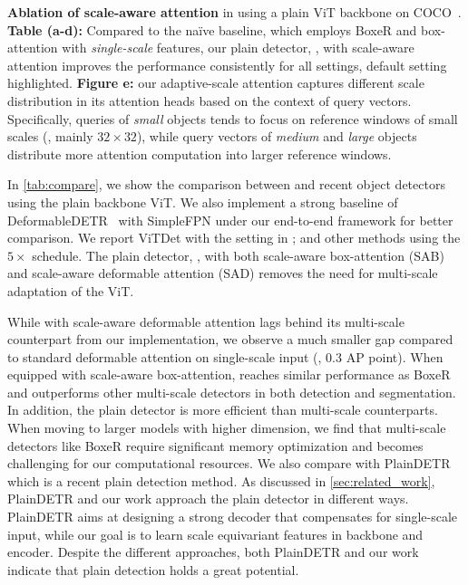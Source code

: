 \begin{table}[t]
\begin{minipage}{0.35\linewidth}
{        }
    \end{minipage}
    \setcounter{table}{2}
    \caption{\label{tab:det_ablation} \textbf{Ablation of scale-aware attention} in \ours using a plain ViT backbone on COCO~\val. \textbf{Table (a-d):} Compared to the na\"ive baseline, which employs BoxeR and box-attention \citep{nguyen2022boxer} with \textit{single-scale} features, our plain detector, \ours, with scale-aware attention improves the performance consistently for all settings, default setting highlighted. 
    \textbf{Figure e:} our adaptive-scale attention captures different scale distribution in its attention heads based on the context of query vectors. Specifically, queries of \emph{small} objects tends to focus on reference windows of small scales (\ie, mainly \(32\times32\)), while query vectors of \emph{medium} and \emph{large} objects distribute more attention computation into larger reference windows.}
\end{table}

 In \cref{tab:compare}, we show the comparison between \ours and recent object detectors using the plain backbone ViT. We also implement a strong baseline of DeformableDETR~\cite{zhu2021deformable} with SimpleFPN under our end-to-end framework for better comparison. We report ViTDet with the setting in \cite{li2022vitdet}; and other methods using the $5\times$ schedule. The plain detector, \ours, with both scale-aware box-attention (SAB) and scale-aware deformable attention (SAD) removes the need for multi-scale adaptation of the ViT.

While \ours with scale-aware deformable attention lags behind its multi-scale counterpart from our implementation, we observe a much smaller gap compared to standard deformable attention on single-scale input (\eg, 0.3  AP point). When equipped with scale-aware box-attention, \ours reaches similar performance as BoxeR and outperforms other multi-scale detectors in both detection and segmentation. In addition, the plain detector is more efficient than multi-scale counterparts. When moving to larger models with higher dimension, we find that multi-scale detectors like BoxeR require significant memory optimization and becomes challenging for our computational resources. We also compare with PlainDETR~\cite{lin2023plaindetr} which is a recent plain detection method. As discussed in \cref{sec:related_work}, PlainDETR and our work approach the plain detector in different ways. PlainDETR aims at designing a strong decoder that compensates for single-scale input, while our goal is to learn scale equivariant features in backbone and encoder. Despite the different approaches, both PlainDETR and our work indicate that plain detection holds a great potential.

